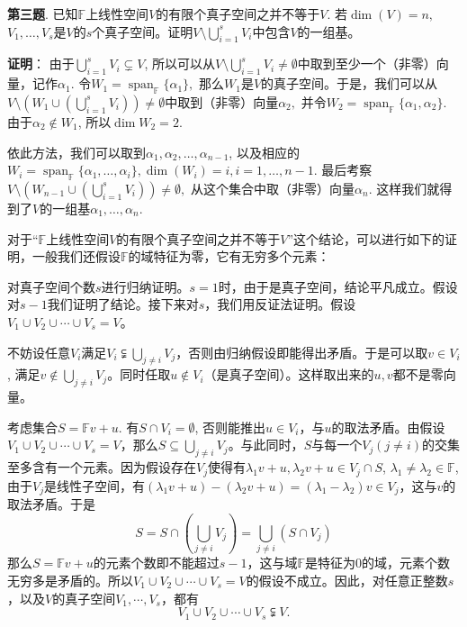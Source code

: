\newpageorvspace

{\bf 第三题}. 已知$\mathbb{F}$上线性空间$V$的有限个真子空间之并不等于$V.$ 若$\dim(V) = n,$ $V_1, \ldots, V_s$是$V$的$s$个真子空间。证明$\displaystyle V \setminus \bigcup_{i=1}^s V_i$中包含$V$的一组基。

\newpageorvspace

{\bf 证明}： 由于$\displaystyle \bigcup_{i=1}^s V_i \subsetneq V$, 所以可以从$V \setminus \bigcup_{i=1}^s V_i \neq \emptyset$中取到至少一个（非零）向量，记作$\alpha_1.$ 令$W_1 = \operatorname{span}_{\mathbb{F}}\{\alpha_1\},$ 那么$W_1$是$V$的真子空间。于是，我们可以从$V \setminus \left( W_1 \cup \left( \bigcup_{i=1}^s V_i \right) \right) \neq \emptyset$中取到（非零）向量$\alpha_2,$ 并令$W_2 = \operatorname{span}_{\mathbb{F}}\{\alpha_1, \alpha_2\}$. 由于$\alpha_2 \not\in W_1$, 所以$\dim W_2 = 2$.

依此方法，我们可以取到$\alpha_1, \alpha_2, \ldots, \alpha_{n-1}$, 以及相应的$W_i = \operatorname{span}_{\mathbb{F}}\{\alpha_1, \ldots, \alpha_i\}, \dim (W_i) = i, i=1, \ldots, n-1$. 最后考察$V \setminus \left( W_{n-1} \cup \left( \bigcup_{i=1}^s V_i \right) \right) \neq \emptyset,$ 从这个集合中取（非零）向量$\alpha_n$. 这样我们就得到了$V$的一组基$\alpha_1, \ldots, \alpha_n.$

\vspace{1em}

对于``$\mathbb{F}$上线性空间$V$的有限个真子空间之并不等于$V$''这个结论，可以进行如下的证明，一般我们还假设$\mathbb{F}$的域特征为零，它有无穷多个元素：

对真子空间个数$s$进行归纳证明。$s=1$时，由于是真子空间，结论平凡成立。假设对$s-1$我们证明了结论。接下来对$s$，我们用反证法证明。假设$V_1\cup V_2\cup \cdots \cup V_s = V$。

不妨设任意$V_i$满足$V_i \subsetneqq \bigcup\limits_{j\neq i} V_j$，否则由归纳假设即能得出矛盾。于是可以取$v\in V_i$, 满足$v\not\in \bigcup\limits_{j\neq i} V_j$。同时任取$u\not\in V_i$（是真子空间）。这样取出来的$u,v$都不是零向量。

考虑集合$S = \mathbb{F}v + u$. 有$S\cap V_i=\emptyset$, 否则能推出$u\in V_i$，与$u$的取法矛盾。由假设$V_1\cup V_2\cup \cdots \cup V_s = V$，那么$S\subseteq \bigcup\limits_{j\neq i} V_j$。与此同时，$S$与每一个$V_j (j\neq i)$的交集至多含有一个元素。因为假设存在$V_j$使得有$\lambda_1v+u, \lambda_2v+u \in V_j\cap S$, $\lambda_1\neq\lambda_2 \in \mathbb{F}$, 由于$V_j$是线性子空间，有$(\lambda_1v+u) - (\lambda_2v+u) = (\lambda_1 - \lambda_2)v \in V_j$，这与$v$的取法矛盾。于是
$$S = S\cap (\bigcup\limits_{j\neq i} V_j) = \bigcup\limits_{j\neq i} (S \cap V_j)$$
那么$S = \mathbb{F}v + u$的元素个数即不能超过$s-1$，这与域$\mathbb{F}$是特征为0的域，元素个数无穷多是矛盾的。所以$V_1\cup V_2\cup \cdots \cup V_s = V$的假设不成立。因此，对任意正整数$s$，以及$V$的真子空间$V_1,\cdots,V_s$，都有
$$V_1\cup V_2\cup \cdots \cup V_s \subsetneqq V.$$

